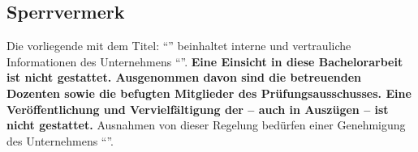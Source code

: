 \begin{titlepage}
\section*{Sperrvermerk} %
\vfill
\noindent
Die vorliegende \mydoctype{} mit dem Titel:
\vfill
\noindent
{\large \enquote{\mytitle}}
\vfill
\noindent
beinhaltet interne und vertrauliche Informationen des Unternehmens \enquote{\mycompany}.
\vfill
\noindent
\textbf{Eine Einsicht in diese Bachelorarbeit ist nicht gestattet. Ausgenommen davon sind die betreuenden Dozenten sowie die befugten Mitglieder des Prüfungsausschusses. Eine Veröffentlichung und Vervielfältigung der \mydoctype{} – auch in Auszügen – ist nicht gestattet.}
\vfill
\noindent
Ausnahmen von dieser Regelung bedürfen einer Genehmigung des Unternehmens \enquote{\mycompany}.
\vfill
\vfill
\vfill
\vfill
\vfill
\vfill
\vfill
\vfill
\end{titlepage}
